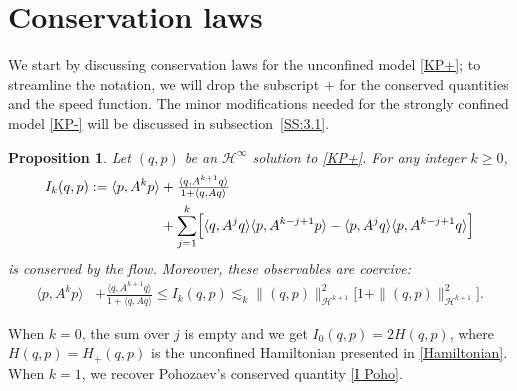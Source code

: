 \documentclass{amsart}
\newtheorem{proposition}[theorem]{Proposition}
\theoremstyle{definition}
\numberwithin{equation}{section}
\renewcommand{\H}{\mathcal H}
\newcommand{\la}{\langle}
\begin{document}
\section{Conservation laws}\label{S:3}

We start by discussing conservation laws for the unconfined model \eqref{KP+}; to streamline the notation, we will drop the subscript $+$ for the conserved quantities and the speed function. The minor modifications needed for the strongly confined model \eqref{KP-} will be discussed in subsection~\ref{SS:3.1}. 

\begin{proposition} Let $(q,p)$ be an $\H^\infty$ solution to \eqref{KP+}. For any integer $k \geq 0$, 
\begin{equation}\label{Ik}
\begin{aligned}
I_k(q,p) :=  \langle p, A^{k} p\rangle &+ \tfrac{\langle q, A^{k+1} q\rangle}{1 + \langle q, A q\rangle}\\
&+ \sum_{j=1}^{k} \Bigl[ \langle q, A^{j} q\rangle \langle p, A^{k-j+1} p\rangle - \langle p, A^{j} q\rangle \langle p, A^{k-j+1} q\rangle \Bigr]
\end{aligned}
\end{equation}
is conserved by the flow. Moreover, these observables are coercive:
\begin{align}\label{Ik coercive}
\la p, A^{k} p\rangle &+ \tfrac{\langle q, A^{k+1} q\rangle}{1 + \langle q, A q\rangle}\leq I_k(q,p)\lesssim_k\|(q,p)\|_{\H^{k+1}}^2 \bigl[1+\|(q,p)\|_{\H^{k+1}}^2 \bigr].
\end{align}
\end{proposition}

When $k=0$, the sum over $j$ is empty and we get $I_0(q,p)=2H(q,p)$, where $H(q,p)=H_+(q,p)$ is the unconfined Hamiltonian presented in \eqref{Hamiltonian}. When $k=1$, we recover Pohozaev's conserved quantity \eqref{I Poho}.
\end{document}
